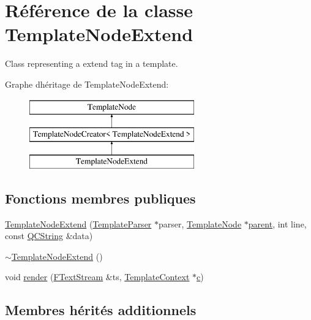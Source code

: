 \hypertarget{class_template_node_extend}{}\section{Référence de la classe Template\+Node\+Extend}
\label{class_template_node_extend}


Class representing a \textquotesingle{}extend\textquotesingle{} tag in a template.  


Graphe d\textquotesingle{}héritage de Template\+Node\+Extend\+:\begin{figure}[H]
\begin{center}
\leavevmode
\includegraphics[height=3.000000cm]{class_template_node_extend}
\end{center}
\end{figure}
\subsection*{Fonctions membres publiques}
\begin{DoxyCompactItemize}
\item 
\hyperlink{class_template_node_extend_aa36132b7fe39fb62f1cc9e79770ba5d8}{Template\+Node\+Extend} (\hyperlink{class_template_parser}{Template\+Parser} $\ast$parser, \hyperlink{class_template_node}{Template\+Node} $\ast$\hyperlink{class_template_node_a69a306ef84e62af9fe57bf9aacc94536}{parent}, int line, const \hyperlink{class_q_c_string}{Q\+C\+String} \&data)
\item 
\hyperlink{class_template_node_extend_a056fcaffcf8bc693c50a40bcd770ac1b}{$\sim$\+Template\+Node\+Extend} ()
\item 
void \hyperlink{class_template_node_extend_a61266a024cdfe201cfd83847676b5441}{render} (\hyperlink{class_f_text_stream}{F\+Text\+Stream} \&ts, \hyperlink{class_template_context}{Template\+Context} $\ast$\hyperlink{060__command__switch_8tcl_ab14f56bc3bd7680490ece4ad7815465f}{c})
\end{DoxyCompactItemize}
\subsection*{Membres hérités additionnels}


